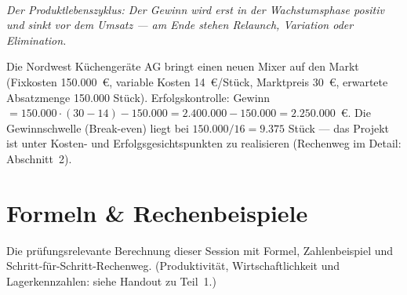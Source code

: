 \documentclass[11pt, a4paper]{article}
\begin{document}
\begin{center}
\\[0.3em]
{\small\itshape Der Produktlebenszyklus: Der Gewinn wird erst in der Wachstumsphase
positiv und sinkt vor dem Umsatz --- am Ende stehen Relaunch, Variation oder
Elimination.}
\end{center}

\begin{beispiel}
Die Nordwest Küchengeräte AG bringt einen neuen Mixer auf den Markt (Fixkosten
150.000~€, variable Kosten 14~€/Stück, Marktpreis 30~€, erwartete Absatzmenge
150.000 Stück). Erfolgskontrolle: Gewinn $= 150.000 \cdot (30 - 14) - 150.000 =
2.400.000 - 150.000 = 2.250.000$~€. Die Gewinnschwelle (Break-even) liegt bei
$150.000 / 16 = 9.375$ Stück --- das Projekt ist unter Kosten- und
Erfolgsgesichtspunkten zu realisieren (Rechenweg im Detail: Abschnitt~2).
\end{beispiel}

\section{Formeln \& Rechenbeispiele}

Die prüfungsrelevante Berechnung dieser Session mit Formel, Zahlenbeispiel und
Schritt-für-Schritt-Rechenweg. (Produktivität, Wirtschaftlichkeit und Lagerkennzahlen:
siehe Handout zu Teil~1.)
\end{document}
